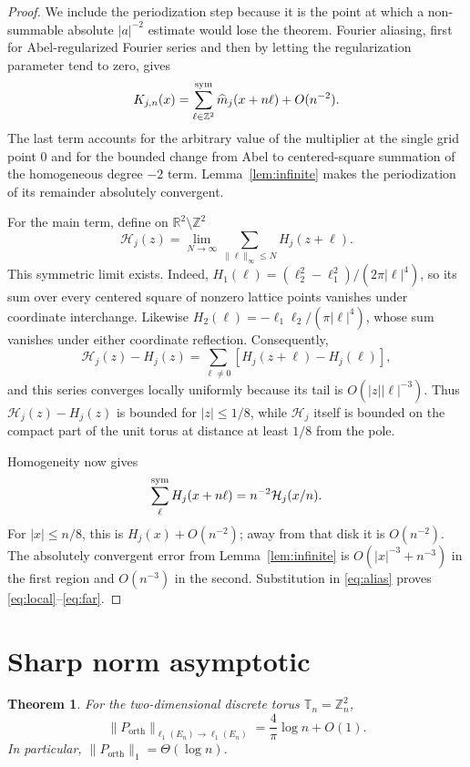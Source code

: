 \documentclass[11pt]{article}
\newtheorem{theorem}{Theorem}
\newcommand{\T}{\mathbb T}
\newcommand{\Z}{\mathbb Z}
\newcommand{\orth}{\mathrm{orth}}
\begin{document}
\begin{proof}
We include the periodization step because it is the point at which a
non-summable absolute $|a|^{-2}$ estimate would lose the theorem.
Fourier aliasing, first for Abel-regularized Fourier series and then by
letting the regularization parameter tend to zero, gives
\begin{equation}\label{eq:alias}
 K_{j,n}(x)=\sum_{\ell\in\Z^2}^{\rm sym}
 \widehat m_j(x+n\ell)+O(n^{-2}).
\end{equation}
The last term accounts for the arbitrary value of the multiplier at the
single grid point $0$ and for the bounded change from Abel to centered-square
summation of the homogeneous degree $-2$ term.  Lemma~\ref{lem:infinite}
makes the periodization of its remainder absolutely convergent.

For the main term, define on $\mathbb R^2\setminus\Z^2$
\[
 \mathcal H_j(z)=\lim_{N\to\infty}
 \sum_{\|\ell\|_\infty\le N}H_j(z+\ell).
\]
This symmetric limit exists.  Indeed,
$H_1(\ell)=(\ell_2^2-\ell_1^2)/(2\pi|\ell|^4)$, so its sum over every
centered square of nonzero lattice points vanishes under coordinate
interchange.  Likewise $H_2(\ell)=-\ell_1\ell_2/(\pi|\ell|^4)$, whose sum
vanishes under either coordinate reflection.
Consequently,
\[
 \mathcal H_j(z)-H_j(z)
 =\sum_{\ell\ne0}[H_j(z+\ell)-H_j(\ell)],
\]
and this series converges locally uniformly because its tail is
$O(|z||\ell|^{-3})$.  Thus $\mathcal H_j(z)-H_j(z)$ is bounded for
$|z|\le1/8$, while $\mathcal H_j$ itself is bounded on the compact part of
the unit torus at distance at least $1/8$ from the pole.

Homogeneity now gives
\[
 \sum_{\ell}^{\rm sym}H_j(x+n\ell)
 =n^{-2}\mathcal H_j(x/n).
\]
For $|x|\le n/8$, this is $H_j(x)+O(n^{-2})$; away from that disk it is
$O(n^{-2})$.  The absolutely convergent error from
Lemma~\ref{lem:infinite} is $O(|x|^{-3}+n^{-3})$ in the first region and
$O(n^{-3})$ in the second.  Substitution in \eqref{eq:alias} proves
\eqref{eq:local}--\eqref{eq:far}.
\end{proof}

\section{Sharp norm asymptotic}

\begin{theorem}\label{thm:main}
For the two-dimensional discrete torus $\T_n=\Z_n^2$,
\[
 \boxed{\displaystyle
 \|P_{\orth}\|_{\ell_1(E_n)\to\ell_1(E_n)}
 =\frac4\pi\log n+O(1).}
\]
In particular, $\|P_{\orth}\|_1=\Theta(\log n)$.
\end{theorem}
\end{document}
